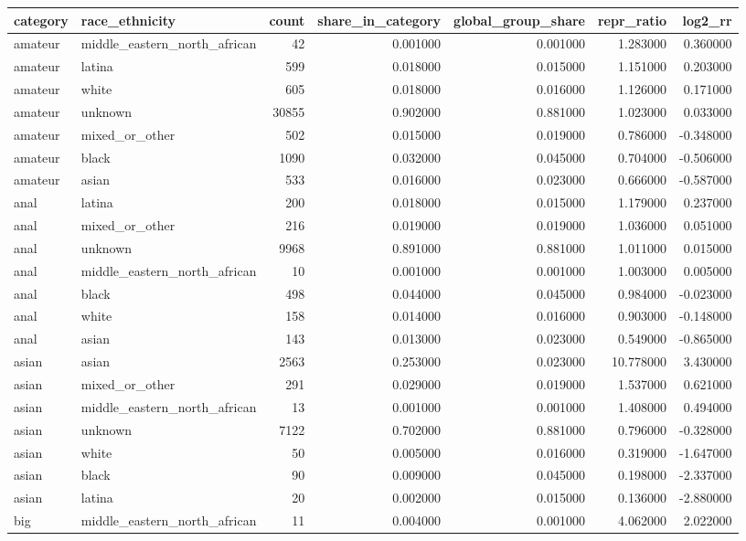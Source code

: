\begin{tabular}{llrrrrr}
\toprule
category & race_ethnicity & count & share_in_category & global_group_share & repr_ratio & log2_rr \\
\midrule
amateur & middle_eastern_north_african & 42 & 0.001000 & 0.001000 & 1.283000 & 0.360000 \\
amateur & latina & 599 & 0.018000 & 0.015000 & 1.151000 & 0.203000 \\
amateur & white & 605 & 0.018000 & 0.016000 & 1.126000 & 0.171000 \\
amateur & unknown & 30855 & 0.902000 & 0.881000 & 1.023000 & 0.033000 \\
amateur & mixed_or_other & 502 & 0.015000 & 0.019000 & 0.786000 & -0.348000 \\
amateur & black & 1090 & 0.032000 & 0.045000 & 0.704000 & -0.506000 \\
amateur & asian & 533 & 0.016000 & 0.023000 & 0.666000 & -0.587000 \\
anal & latina & 200 & 0.018000 & 0.015000 & 1.179000 & 0.237000 \\
anal & mixed_or_other & 216 & 0.019000 & 0.019000 & 1.036000 & 0.051000 \\
anal & unknown & 9968 & 0.891000 & 0.881000 & 1.011000 & 0.015000 \\
anal & middle_eastern_north_african & 10 & 0.001000 & 0.001000 & 1.003000 & 0.005000 \\
anal & black & 498 & 0.044000 & 0.045000 & 0.984000 & -0.023000 \\
anal & white & 158 & 0.014000 & 0.016000 & 0.903000 & -0.148000 \\
anal & asian & 143 & 0.013000 & 0.023000 & 0.549000 & -0.865000 \\
asian & asian & 2563 & 0.253000 & 0.023000 & 10.778000 & 3.430000 \\
asian & mixed_or_other & 291 & 0.029000 & 0.019000 & 1.537000 & 0.621000 \\
asian & middle_eastern_north_african & 13 & 0.001000 & 0.001000 & 1.408000 & 0.494000 \\
asian & unknown & 7122 & 0.702000 & 0.881000 & 0.796000 & -0.328000 \\
asian & white & 50 & 0.005000 & 0.016000 & 0.319000 & -1.647000 \\
asian & black & 90 & 0.009000 & 0.045000 & 0.198000 & -2.337000 \\
asian & latina & 20 & 0.002000 & 0.015000 & 0.136000 & -2.880000 \\
big & middle_eastern_north_african & 11 & 0.004000 & 0.001000 & 4.062000 & 2.022000 \\

\end{tabular}
